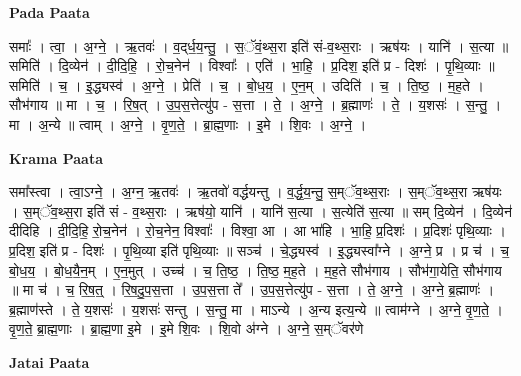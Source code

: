\documentclass[17pt]{extarticle}
\begin{document}
\textbf{Pada Paata} \newline

समाः᳚ । त्वा॒ । अ॒ग्ने॒ । ऋ॒तवः॑ । व॒द्‌र्ध॒य॒न्तु॒ । स॒ॅवं॒थ्स॒रा इति॑ सं-व॒थ्स॒राः । ऋष॑यः । यानि॑ । स॒त्या ॥ समिति॑ । दि॒व्येन॑ । दी॒दि॒हि॒ । रो॒च॒नेन॑ । विश्वाः᳚ । एति॑ । भा॒हि॒ । प्र॒दिश॒ इति॑ प्र - दिशः॑ । पृ॒थि॒व्याः ॥ समिति॑ । च॒ । इ॒द्ध्यस्व॑ । अ॒ग्ने॒ । प्रेति॑ । च॒ । बो॒ध॒य॒ । ए॒न॒म् । उदिति॑ । च॒ । ति॒ष्ठ॒ । म॒ह॒ते । सौभ॑गाय ॥ मा । च॒ । रि॒ष॒त् । उ॒प॒स॒त्तेत्यु॑प - स॒त्ता । ते॒ । अ॒ग्ने॒ । ब्र॒ह्माणः॑ । ते॒ । य॒शसः॑ । स॒न्तु॒ । मा । अ॒न्ये ॥ त्वाम् । अ॒ग्ने॒ । वृ॒ण॒ते॒ । ब्रा॒ह्म॒णाः । इ॒मे । शि॒वः । अ॒ग्ने॒ ।  \newline


\textbf{Krama Paata} \newline

समा᳚स्त्वा । त्वा॒ऽग्ने॒ । अ॒ग्न॒ ऋ॒तवः॑ । ऋ॒तवो॑ वर्द्धयन्तु । व॒र्द्ध॒य॒न्तु॒ स॒म्ॅव॒थ्स॒राः । स॒म्ॅव॒थ्स॒रा ऋष॑यः । स॒म्ॅव॒थ्स॒रा इति॑ सं - व॒थ्स॒राः । ऋष॑यो॒ यानि॑ । यानि॑ स॒त्या । स॒त्येति॑ स॒त्या ॥ सम् दि॒व्येन॑ । दि॒व्येन॑ दीदिहि । दी॒दि॒हि॒ रो॒च॒नेन॑ । रो॒च॒नेन॒ विश्वाः᳚ । विश्वा॒ आ । आ भा॑हि । भा॒हि॒ प्र॒दिशः॑ । प्र॒दिशः॑ पृथि॒व्याः । प्र॒दिश॒ इति॑ प्र - दिशः॑ । पृ॒थि॒व्या इति॑ पृथि॒व्याः ॥ सञ्च॑ । चे॒द्ध्यस्व॑ । इ॒द्ध्यस्वा᳚ग्ने । अ॒ग्ने॒ प्र । प्र च॑ । च॒ बो॒ध॒य॒ । बो॒ध॒यै॒न॒म् । ए॒न॒मुत् । उच्च॑ । च॒ ति॒ष्ठ॒ । ति॒ष्ठ॒ म॒ह॒ते । म॒ह॒ते सौभ॑गाय । सौभ॑गा॒येति॒ सौभ॑गाय ॥ मा च॑ । च॒ रि॒ष॒त्॒ । रि॒ष॒दु॒प॒स॒त्ता । उ॒प॒स॒त्ता ते᳚ । उ॒प॒स॒त्तेत्यु॑प - स॒त्ता । ते॒ अ॒ग्ने॒ । अ॒ग्ने॒ ब्र॒ह्माणः॑ । ब्र॒ह्माण॑स्ते । ते॒ य॒शसः॑ । य॒शसः॑ सन्तु । स॒न्तु॒ मा । माऽन्ये । अ॒न्य इत्य॒न्ये ॥ त्वाम॑ग्ने । अ॒ग्ने॒ वृ॒ण॒ते॒ । वृ॒ण॒ते॒ ब्रा॒ह्म॒णाः । ब्रा॒ह्म॒णा इ॒मे । इ॒मे शि॒वः । शि॒वो अ॑ग्ने । अ॒ग्ने॒ स॒म्ॅवर॑णे \newline

\textbf{Jatai Paata} \newline
\end{document}
